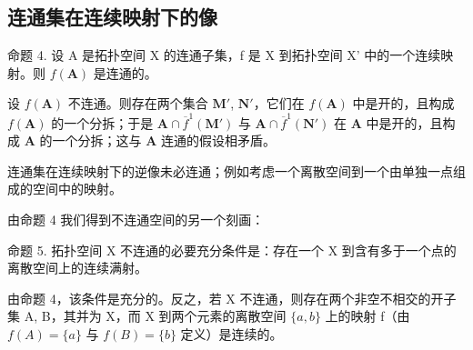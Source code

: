 \subsection{连通集在连续映射下的像}

命题 4. 设 A 是拓扑空间 X 的连通子集，f 是 X 到拓扑空间 X' 中的一个连续映射。则 \(f(\mathbf{A})\) 是连通的。

设 \(f(\mathbf{A})\) 不连通。则存在两个集合 \(\mathbf{M}'\), \(\mathbf{N}'\)，它们在 \(f(\mathbf{A})\) 中是开的，且构成 \(f(\mathbf{A})\) 的一个分拆；于是 \(\mathbf{A} \cap \overline{f}^{1}(\mathbf{M}')\) 与 \(\mathbf{A} \cap \overline{f}^{1}(\mathbf{N}')\) 在 \(\mathbf{A}\) 中是开的，且构成 \(\mathbf{A}\) 的一个分拆；这与 \(\mathbf{A}\) 连通的假设相矛盾。

连通集在连续映射下的逆像未必连通；例如考虑一个离散空间到一个由单独一点组成的空间中的映射。

由命题 4 我们得到不连通空间的另一个刻画：

命题 5. 拓扑空间 X 不连通的必要充分条件是：存在一个 X 到含有多于一个点的离散空间上的连续满射。

由命题 4，该条件是充分的。反之，若 X 不连通，则存在两个非空不相交的开子集 A, B，其并为 X，而 X 到两个元素的离散空间 \(\{a, b\}\) 上的映射 f（由 \(f(A) = \{a\}\) 与 \(f(B) = \{b\}\) 定义）是连续的。

